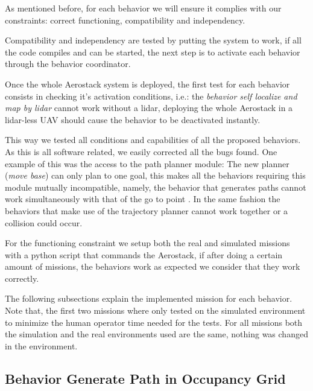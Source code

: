   As mentioned before, for each behavior we will ensure it complies with our constraints: correct functioning, compatibility and independency. 
  
  Compatibility and independency are tested by putting the system to work, if all the code compiles and can be started, the next step is to activate each behavior through the behavior coordinator.

  Once the whole Aerostack system is deployed, the first test for each behavior consists in checking it's activation conditions, i.e.: the \textit{behavior self localize and map by lidar} cannot work without a lidar, deploying the whole Aerostack in a lidar-less UAV should cause the behavior to be deactivated instantly.

  This way we tested all conditions and capabilities of all the proposed behaviors. As this is all software related, we easily corrected all the bugs found. One example of this was the access to the path planner module: The new planner (\textit{move base}) can only plan to one goal, this makes all the behaviors requiring this module mutually incompatible, namely, the behavior that generates paths cannot work simultaneously with that of the go to point . In the same fashion the behaviors that make use of the trajectory planner cannot work together or a collision could occur.

  For the functioning constraint we setup both the real and simulated missions with a python script that commands the Aerostack, if after doing a certain amount of missions, the behaviors work as expected we consider that they work correctly. 
  

  The following subsections explain the implemented mission for each behavior. Note that, the first two missions where only tested on the simulated environment to minimize the human operator time needed for the tests. For all missions both the simulation and the real environments used are the same, nothing was changed in the environment.

  \subsection{Behavior Generate Path in Occupancy Grid} \label{ch_5:subsect:behav_genpath_mission}

